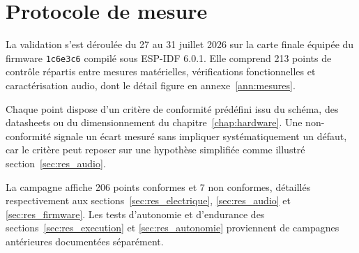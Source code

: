 \section{Protocole de mesure}
\label{sec:res_protocole}

La validation s'est déroulée du 27 au 31 juillet 2026 sur la carte finale équipée du firmware \texttt{1c6e3c6} compilé sous ESP-IDF 6.0.1. Elle comprend 213 points de contrôle répartis entre mesures matérielles, vérifications fonctionnelles et caractérisation audio, dont le détail figure en annexe~\ref{ann:mesures}.

Chaque point dispose d'un critère de conformité prédéfini issu du schéma, des datasheets ou du dimensionnement du chapitre~\ref{chap:hardware}. Une non-conformité signale un écart mesuré sans impliquer systématiquement un défaut, car le critère peut reposer sur une hypothèse simplifiée comme illustré section~\ref{sec:res_audio}.

La campagne affiche 206 points conformes et 7 non conformes, détaillés respectivement aux sections~\ref{sec:res_electrique}, \ref{sec:res_audio} et \ref{sec:res_firmware}. Les tests d'autonomie et d'endurance des sections~\ref{sec:res_execution} et \ref{sec:res_autonomie} proviennent de campagnes antérieures documentées séparément.